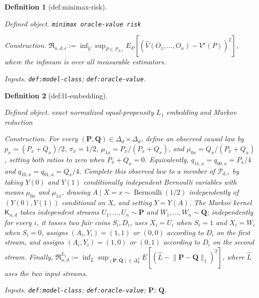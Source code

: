 \documentclass{article}
\newtheorem{definition}{Definition}
\begin{document}
\begin{definition}[def:minimax-risk]\label{def:minimax-risk}
\par\smallskip\noindent\emph{Defined object.} \texttt{minimax oracle-\allowbreak{}value risk}
\par\smallskip\noindent\emph{Construction.} \(\mathfrak R_{n,d,\epsilon}:=\inf_{\widehat V}\sup_{P\in\mathcal P_{d,\epsilon}}E_P[(\widehat V(O_1,\ldots,O_n)-V^\star(P))^2]\), where the infimum is over all measurable estimators.
\par\smallskip\noindent\emph{Inputs.} \texttt{def:\allowbreak{}model-\allowbreak{}class}; \texttt{def:\allowbreak{}oracle-\allowbreak{}value}.
\end{definition}

\begin{definition}[def:l1-embedding]\label{def:l1-embedding}
\par\smallskip\noindent\emph{Defined object.} exact normalized equal-propensity \(L_1\) embedding and Markov reduction
\par\smallskip\noindent\emph{Construction.} For every \((\mathbf P,\mathbf Q)\in\Delta_d\times\Delta_d\), define an observed causal law by \(p_x=(P_x+Q_x)/2\), \(\pi_x=1/2\), \(\mu_{1x}=P_x/(P_x+Q_x)\), and \(\mu_{0x}=Q_x/(P_x+Q_x)\), setting both ratios to zero when \(P_x+Q_x=0\). Equivalently, \(q_{11,x}=q_{00,x}=P_x/4\) and \(q_{10,x}=q_{01,x}=Q_x/4\). Complete this observed law to a member of \(\mathcal P_{d,\epsilon}\) by taking \(Y(0)\) and \(Y(1)\) conditionally independent Bernoulli variables with means \(\mu_{0x}\) and \(\mu_{1x}\), drawing \(A\mid X=x\sim\operatorname{Bernoulli}(1/2)\) independently of \((Y(0),Y(1))\) conditional on \(X\), and setting \(Y=Y(A)\). The Markov kernel \(\mathsf K_{n,d}\) takes independent streams \(U_1,\ldots,U_n\sim\mathbf P\) and \(W_1,\ldots,W_n\sim\mathbf Q\); independently for every \(i\), it tosses two fair coins \(S_i,D_i\), uses \(X_i=U_i\) when \(S_i=1\) and \(X_i=W_i\) when \(S_i=0\), assigns \((A_i,Y_i)=(1,1)\) or \((0,0)\) according to \(D_i\) on the first stream, and assigns \((A_i,Y_i)=(1,0)\) or \((0,1)\) according to \(D_i\) on the second stream. Finally, \(\mathfrak R^{L_1}_{n,d}:=\inf_{\widehat L}\sup_{(\mathbf P,\mathbf Q)\in\Delta_d^2}E[(\widehat L-\lVert\mathbf P-\mathbf Q\rVert_1)^2]\), where \(\widehat L\) uses the two input streams.
\par\smallskip\noindent\emph{Inputs.} \texttt{def:\allowbreak{}model-\allowbreak{}class}; \texttt{def:\allowbreak{}oracle-\allowbreak{}value}; \(\mathbf P\); \(\mathbf Q\).
\end{definition}
\end{document}
